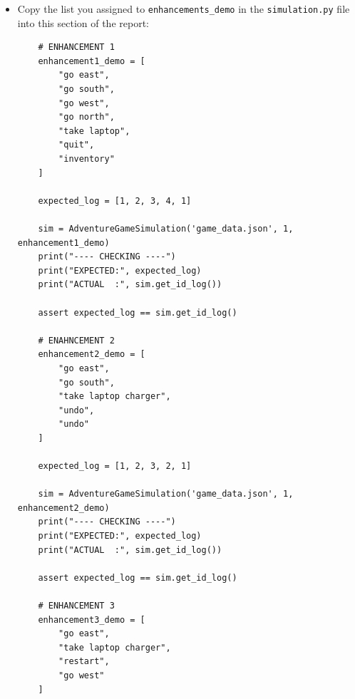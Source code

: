 \documentclass[11pt]{article}
\begin{document}
\begin{enumerate}
\begin{itemize}
\medskip
        \texttt{Class ArenaPlayer} :
        \begin{itemize}
            \item \texttt{def arena\_energy\_cost}
            \item \texttt{def arena\_beats}
            \item \texttt{def arena\_resolve\_round}
            \item \texttt{def arena\_parse\_move}
            \item \texttt{def arena\_enforce\_energy}
            \item \texttt{def arena\_ai\_choose}
            \item \texttt{def arena\_print\_rules}
            \item \texttt{def arena\_prompt\_move}
            \item \texttt{def arena\_apply\_regen}
            \item \texttt{def play\_evolution\_arena}
        \end{itemize}
        \item Copy the list you assigned to \texttt{enhancements\_demo} in the \texttt{simulation.py} file into this section of the report:

        \begin{verbatim}
    # ENHANCEMENT 1
    enhancement1_demo = [
        "go east",
        "go south",
        "go west",
        "go north",
        "take laptop",
        "quit",
        "inventory"
    ]

    expected_log = [1, 2, 3, 4, 1]

    sim = AdventureGameSimulation('game_data.json', 1, enhancement1_demo)
    print("---- CHECKING ----")
    print("EXPECTED:", expected_log)
    print("ACTUAL  :", sim.get_id_log())

    assert expected_log == sim.get_id_log()

    # ENAHNCEMENT 2
    enhancement2_demo = [
        "go east",
        "go south",
        "take laptop charger",
        "undo",
        "undo"
    ]

    expected_log = [1, 2, 3, 2, 1]

    sim = AdventureGameSimulation('game_data.json', 1, enhancement2_demo)
    print("---- CHECKING ----")
    print("EXPECTED:", expected_log)
    print("ACTUAL  :", sim.get_id_log())

    assert expected_log == sim.get_id_log()

    # ENHANCEMENT 3
    enhancement3_demo = [
        "go east",
        "take laptop charger",
        "restart",
        "go west"
    ]


\end{verbatim}
\end{itemize}
\end{enumerate}
\end{document}
